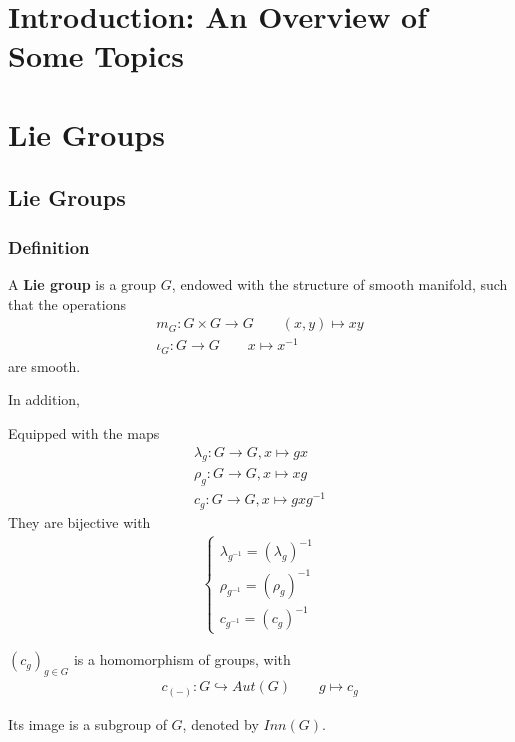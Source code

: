 \documentclass[Total.tex]{subfiles}
\begin{document}
	\chapter{Introduction: An Overview of Some Topics}
		
	\chapter{Lie Groups}
		\section{Lie Groups}
			\subsection{Definition}
			\begin{Def}
				A \textbf{Lie group} is a group $G$, endowed with the structure of smooth manifold, such that the operations
				\begin{gather*}
					m_G:G\times G\rightarrow G\qquad (x,y)\mapsto xy\\
					\iota_G:G\rightarrow G\qquad x\mapsto x^{-1}
				\end{gather*}
				are smooth.
			\end{Def}
			
			In addition,
			\begin{Def}
				Equipped with the maps
				\begin{gather*}
					\lambda_g:G\rightarrow G,x\mapsto gx\\
					\rho_g:G\rightarrow G,x\mapsto xg\\
					c_g:G\rightarrow G,x\mapsto gxg^{-1}
				\end{gather*}
				They are bijective with
				\begin{gather*}
					\begin{cases}
						\lambda_{g^{-1}}=(\lambda_g)^{-1}\\
						\rho_{g^{-1}}=(\rho_g)^{-1}\\
						c_{g^{-1}}=(c_g)^{-1}
					\end{cases}
				\end{gather*}
			\end{Def}
			
			$(c_g)_{g\in G}$ is a homomorphism of groups, with 
			\begin{gather*}
				c_{(-)}:G\hookrightarrow Aut(G)\qquad g\mapsto c_g
			\end{gather*}
			
			Its image is a subgroup of $G$, denoted by $Inn(G)$. 
			
\end{document}
